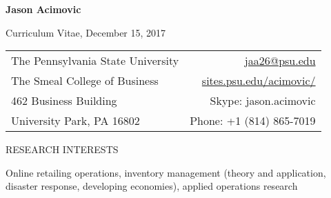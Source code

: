 \documentclass[letterpaper,11pt,oneside]{article}
\newcommand\myIndent{0.75in}
\newcommand\myHangIndent{1in}
\newcommand\mySpaceBeforeSection{0.9em}
\newcommand{\NiceIndent}{ \parindent=\myIndent \hangindent=\myHangIndent }
\begin{document}




\noindent  \LARGE{\textbf{Jason Acimovic}}  \\
\vspace{-2ex}
\normalsize

\noindent Curriculum Vitae, December 15, 2017

\begin{center}
    \begin{tabular}{l r}
         The Pennsylvania State University    & \hspace{1in} \href{mailto:jaa26@psu.edu}{jaa26@psu.edu} \\
         The Smeal College of Business    & \hspace{1in}  \href{sites.psu.edu/acimovic/}{sites.psu.edu/acimovic/}   \\
         462 Business Building             & \hspace{1in} Skype: jason.acimovic  \\
         University Park, PA  16802 & \hspace{1in} Phone: +1 (814) 865-7019 
    \end{tabular}
\end{center}

\vspace{-0.5em}

\hrulefill

\vspace{\mySpaceBeforeSection}






\noindent RESEARCH INTERESTS



\NiceIndent Online retailing operations, inventory management (theory and application, disaster response, developing economies), applied operations research
\end{document}
